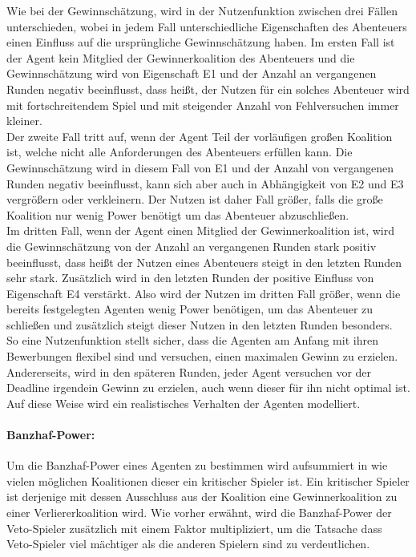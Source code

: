 \documentclass[fleqn,10pt]{SelfArx} %
\begin{document}
Wie bei der Gewinnschätzung, wird in der Nutzenfunktion zwischen drei Fällen unterschieden, wobei in jedem Fall unterschiedliche Eigenschaften des Abenteuers einen Einfluss auf die ursprüngliche Gewinnschätzung haben. Im ersten Fall ist der Agent kein Mitglied der Gewinnerkoalition des Abenteuers und die Gewinnschätzung wird von Eigenschaft E1 und der Anzahl an vergangenen Runden negativ beeinflusst, dass heißt, der Nutzen für ein solches Abenteuer wird mit fortschreitendem Spiel und mit steigender Anzahl von Fehlversuchen immer kleiner. \\
Der zweite Fall tritt auf, wenn der Agent Teil der vorläufigen großen Koalition ist, welche nicht alle Anforderungen des Abenteuers erfüllen kann. Die Gewinnschätzung wird in diesem Fall von E1 und der Anzahl von vergangenen Runden negativ beeinflusst, kann sich aber auch in Abhängigkeit von E2 und E3 vergrößern oder verkleinern. Der Nutzen ist daher Fall größer, falls die große Koalition nur wenig Power benötigt um das Abenteuer abzuschließen. \\
Im dritten Fall, wenn der Agent einen Mitglied der Gewinnerkoalition ist, wird die Gewinnschätzung von der Anzahl an vergangenen Runden stark positiv beeinflusst, dass heißt der Nutzen eines Abenteuers steigt in den letzten Runden sehr stark. Zusätzlich wird in den letzten Runden der positive Einfluss von Eigenschaft E4 verstärkt. Also wird der Nutzen im dritten Fall größer, wenn die bereits festgelegten Agenten wenig Power benötigen, um das Abenteuer zu schließen und zusätzlich steigt dieser Nutzen in den letzten Runden besonders.\\
So eine Nutzenfunktion stellt sicher, dass die Agenten am Anfang mit ihren Bewerbungen flexibel sind und versuchen, einen maximalen Gewinn zu erzielen. Andererseits, wird in den späteren Runden, jeder Agent versuchen vor der Deadline irgendein Gewinn zu erzielen, auch wenn dieser für ihn nicht optimal ist. Auf diese Weise wird ein realistisches Verhalten der Agenten modelliert. 


\paragraph{Banzhaf-Power:}
Um die Banzhaf-Power eines Agenten zu bestimmen wird aufsummiert in wie vielen möglichen Koalitionen dieser ein kritischer Spieler ist. Ein kritischer Spieler ist derjenige mit dessen Ausschluss aus der Koalition eine Gewinnerkoalition zu einer Verliererkoalition wird. Wie vorher erwähnt, wird die Banzhaf-Power der Veto-Spieler zusätzlich mit einem Faktor multipliziert, um die Tatsache dass Veto-Spieler viel mächtiger als die anderen Spielern sind zu verdeutlichen.
\end{document}
